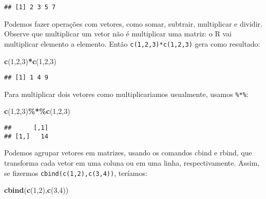 \documentclass[
]{book}
\newenvironment{Shaded}{\begin{snugshade}}{\end{snugshade}}
\newcommand{\DecValTok}[1]{\textcolor[rgb]{0.00,0.00,0.81}{#1}}
\newcommand{\KeywordTok}[1]{\textcolor[rgb]{0.13,0.29,0.53}{\textbf{#1}}}
\newcommand{\NormalTok}[1]{#1}
\newcommand{\OperatorTok}[1]{\textcolor[rgb]{0.81,0.36,0.00}{\textbf{#1}}}
\begin{document}
\begin{verbatim}
## [1] 2 3 5 7
\end{verbatim}

Podemos fazer operações com vetores, como somar, subtrair, multiplicar e dividir. Observe que multiplicar um vetor não é multiplicar uma matriz: o R vai multiplicar elemento a elemento. Então \texttt{c(1,2,3)*c(1,2,3)} gera como resultado:

\begin{Shaded}
\begin{Highlighting}[]
\KeywordTok{c}\NormalTok{(}\DecValTok{1}\NormalTok{,}\DecValTok{2}\NormalTok{,}\DecValTok{3}\NormalTok{)}\OperatorTok{*}\KeywordTok{c}\NormalTok{(}\DecValTok{1}\NormalTok{,}\DecValTok{2}\NormalTok{,}\DecValTok{3}\NormalTok{)}
\end{Highlighting}
\end{Shaded}

\begin{verbatim}
## [1] 1 4 9
\end{verbatim}

Para multiplicar dois vetores como multiplicariamos usualmente, usamos \texttt{\%*\%}:

\begin{Shaded}
\begin{Highlighting}[]
\KeywordTok{c}\NormalTok{(}\DecValTok{1}\NormalTok{,}\DecValTok{2}\NormalTok{,}\DecValTok{3}\NormalTok{)}\OperatorTok{\%*\%}\KeywordTok{c}\NormalTok{(}\DecValTok{1}\NormalTok{,}\DecValTok{2}\NormalTok{,}\DecValTok{3}\NormalTok{)}
\end{Highlighting}
\end{Shaded}

\begin{verbatim}
##      [,1]
## [1,]   14
\end{verbatim}

Podemos agrupar vetores em matrizes, usando os comandos cbind e rbind, que transforma cada vetor em uma coluna ou em uma linha, respectivamente. Assim, se fizermos \texttt{cbind(c(1,2),c(3,4))}, teríamos:

\begin{Shaded}
\begin{Highlighting}[]
\KeywordTok{cbind}\NormalTok{(}\KeywordTok{c}\NormalTok{(}\DecValTok{1}\NormalTok{,}\DecValTok{2}\NormalTok{),}\KeywordTok{c}\NormalTok{(}\DecValTok{3}\NormalTok{,}\DecValTok{4}\NormalTok{))}
\end{Highlighting}
\end{Shaded}
\end{document}
